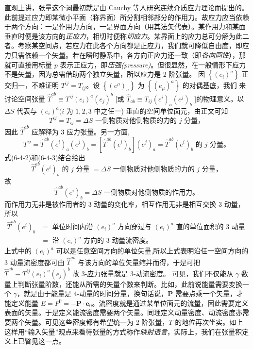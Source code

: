 直观上讲，张量这个词最初就是由 Cauchy 等人研究连续介质应力理论而提出的。此前提过应力即某微小平面（称界面）所分割相邻部分的作用力。故应力应当依赖于两个方向：一是作用力方向，一是界面方向（用其法矢代表）。某作用力和某面垂直时便是该方向的\textit{正应力}，相切时便称\textit{切应力}。某界面上的应力总可分解为此二者。考察某空间点，若应力在此各个方向都是正应力，我们就可降低自由度，即应力只需依赖一个矢量。若在瞬时静系中，各方向正应力还一致（即\textit{各向同性}），那就可直接用标量 $p$ 表示正应力，即\textit{压强(pressure)}。但很显然，在一般情形下应力不是矢量，因为总需借助两个独立矢量，所以应力是 2 阶张量。
因 $\left\{\left(e_i\right)^a\right\}$ 正交归一，不难证明 $T^{i j}=T_{i j}$。设 $\left\{\left(e^\mu\right)_a\right\}$ 为 $\left\{\left(e_\mu\right)^a\right\}$ 的对偶基底，我们 来讨论空间张量 $\hat{T}^{a b} \equiv T^{i j}\left(e_i\right)^a\left(e_j\right)^b$ [或 $\hat{T}_{a b} \equiv T_{i j}\left(e^i\right)_a\left(e^j\right)_b$ ]的物理意义。以 $\Delta S$ 代表与 $\left(e_i\right)^a(i$ 为 $1,2,3$ 中之任一) 垂直的空间单位面元，由正文可知
\[
T^{i j}=T_{i j}=\Delta S \text { 一侧物质对他侧物质的力的 } j \text { 分量，}
\]
因此 $\hat{T}^{a b}$ 应解释为 3 应力张量。另一方面,
\[
T^{i j}=\hat{T}^{a b}\left(e^i\right)_a\left(e^j\right)_b=\left[\hat{T}^{a b}\left(e^i\right)_b\right]\left(e^j\right)_a=\hat{T}^{a b}\left(e^i\right)_b \text { 的 } j \text { 分量。}
\]
式(6-4-2)和(6-4-3)结合给出
\[
\hat{T}^{a b}\left(e^i\right)_b \text { 的 } j \text { 分量 }=\Delta S \text { 一侧物质对他侧物质的力的 } j \text { 分量，}
\]
故
\[
\hat{T}^{a b}\left(e^i\right)_b=\Delta S \text { 一侧物质对他侧物质的作用力。}
\]
而作用力无非是被作用者的 3 动量的变化率，相互作用无非是相互交换 3 动量，所以
\[
\begin{aligned}
\hat{T}^{a b}\left(e^i\right)_b & =\text { 单位时间内沿 }\left(e_i\right)^a \text { 方向穿过与 }\left(e_i\right)^a \text { 直的单位面积的 } 3 \text { 动量 } \\
& =\text { 沿 }\left(e_i\right)^a \text { 方向的 } 3 \text { 动量流密度。}
\end{aligned}
\]
上式中的 $\left(e_i\right)^a$ 可以是任意空间方向的单位矢量,所以上式表明沿任一空间方向的 3 动量流密度都可由 $\hat{T}^{a b}$ 与该方向的单位矢量缩并而得，于是可把 $\hat{T}^{a b} \equiv T^{i j}\left(e_i\right)^a\left(e_j\right)^b$
故 3-应力张量就是 3-动流密度。
可见，我们不仅能从 $\gamma$ 数量上判断张量阶数，还能从所需的矢量个数来判断。比如，此前说能量需要变换一个 $\gamma$，就是由于能量是 4-动量的时间分量，换句话说，$\bm P$ 需要点乘一个矢量，才能定义能量 $E=P^0=-\bm P\cdot \bm e_0$。流密度就是通过某单位面元的流量，因此需要定义表面的矢量。于是定义能流密度需要两个矢量。同理定义动量密度、动流密度亦需要两个矢量。可见这些密度都有希望统一为 2 阶张量，$T$ 的地位再次坐实。如上这样用“输入矢量”观点来看待张量的方式称作\textit{映射语言}，实际上，我们在张量积定义上已瞥见这一点。 

